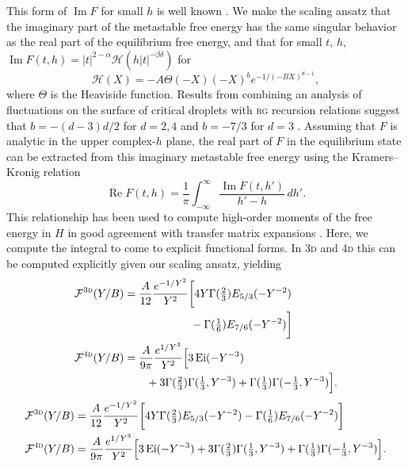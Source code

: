 \documentclass[aps,prl,reprint]{revtex4-1}
\def\[{\begin{equation}}
\def\]{\end{equation}}
\def\ei{\mathop{\mathrm{Ei}}\nolimits} %
\def\re{\mathop{\mathrm{Re}}\nolimits}
\def\im{\mathop{\mathrm{Im}}\nolimits}
\def\dd{d} %
\def\fF{\mathcal F}  %
\def\fiF{\mathcal H} %
\def\dim{d}
\def\threedee{\textsc{3d} }
\def\fourdee{\textsc{4d} }
\newif\ifreprint
\begin{document}
This form of $\im F$ for small $h$ is well known
\cite{langer.1967.condensation,harris.1984.metastability}.  We make the scaling
ansatz that the imaginary part of the metastable free energy has the same
singular behavior as the real part of the equilibrium free energy, and that for
small $t$, $h$, $\im F(t,h)=|t|^{2-\alpha}\fiF(h|t|^{-\beta\delta})$ for
\[
  \fiF(X)=-A\Theta(-X)(-X)^be^{-1/(-BX)^{\dim-1}},
  \label{eq:im.scaling}
\]
where $\Theta$ is the Heaviside function. Results from combining an analysis
of fluctuations on the surface of critical droplets with \textsc{rg} recursion
relations suggest that $b=-(d-3)d/2$ for $d=2,4$ and $b=-7/3$ for
$d=3$
\cite{houghton.1980.metastable,rudnick.1976.equations,gunther.1980.goldstone}.
Assuming that $F$ is analytic in the upper complex-$h$ plane, the real part of
$F$ in the equilibrium state can be extracted from this imaginary metastable
free energy using the Kramers--Kronig relation
\[
  \re F(t,h)=\frac1\pi\int_{-\infty}^\infty\frac{\im F(t,h')}{h'-h}\,\dd h'.
\]
This relationship has been used to compute high-order moments of the free
energy in $H$ in good agreement with transfer matrix expansions
\cite{lowe.1980.instantons}. Here, we compute the integral to come to explicit
functional forms.  In \threedee and \fourdee this can be computed
explicitly given our scaling ansatz, yielding
\def\eqthreedeeone{
  \fF^\threedee(Y/B)&=
  \frac{A}{12}\frac{e^{-1/Y^2}}{Y^2}
  \bigg[4Y\Gamma(\tfrac23)E_{5/3}(-Y^{-2})
}
\def\eqthreedeetwo{
  -\Gamma(\tfrac16)E_{7/6}(-Y^{-2})\bigg]
}
\def\eqfourdeeone{
  \fF^\fourdee(Y/B)&=
  \frac{A}{9\pi}\frac{e^{1/Y^3}}{Y^2}
  \Big[3\ei(-Y^{-3})
}
\def\eqfourdeetwo{
  +3\Gamma(\tfrac23)\Gamma(\tfrac13,Y^{-3})
  +\Gamma(\tfrac13)\Gamma(-\tfrac13,Y^{-3})\Big]
}
\ifreprint
\begin{align}
  &\begin{aligned}
    \eqthreedeeone\\
    &\hspace{6em}
    \eqthreedeetwo
  \end{aligned}
  \\
  &\begin{aligned}
    \eqfourdeeone
    \\
    &\hspace{2em}
    \eqfourdeetwo.
  \end{aligned}
\end{align}
\else
\begin{align}
  \eqthreedeeone\eqthreedeetwo
  \\
  \eqfourdeeone\eqfourdeetwo.
\end{align}
\end{document}
